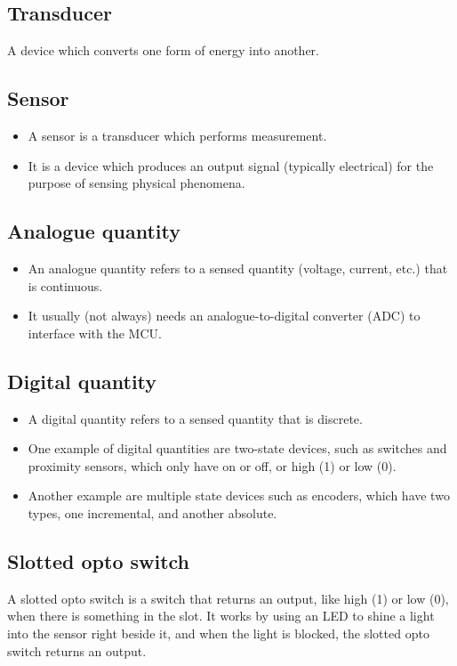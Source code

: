 \documentclass[11pt]{article}
\begin{document}
\subsection{Transducer}
\label{sec:org26c44e8}
A device which converts one form of energy into another.

\subsection{Sensor}
\label{sec:org2198fc3}
\begin{itemize}
\item A sensor is a transducer which performs measurement.
\item It is a device which produces an output signal (typically electrical) for the purpose of sensing physical phenomena.
\end{itemize}

\subsection{Analogue quantity}
\label{sec:org4ca1173}
\begin{itemize}
\item An analogue quantity refers to a sensed quantity (voltage, current, etc.) that is continuous.
\item It usually (not always) needs an analogue-to-digital converter (ADC) to interface with the MCU.
\end{itemize}

\subsection{Digital quantity}
\label{sec:org2dc9e52}
\begin{itemize}
\item A digital quantity refers to a sensed quantity that is discrete.
\item One example of digital quantities are two-state devices, such as switches and proximity sensors, which only have on or off, or high (1) or low (0).
\item Another example are multiple state devices such as encoders, which have two types, one incremental, and another absolute.
\end{itemize}

\subsection{Slotted opto switch}
\label{sec:orge54ef5a}
A slotted opto switch is a switch that returns an output, like high (1) or low (0), when there is something in the slot. It works by using an LED to shine a light into the sensor right beside it, and when the light is blocked, the slotted opto switch returns an output.
\end{document}
